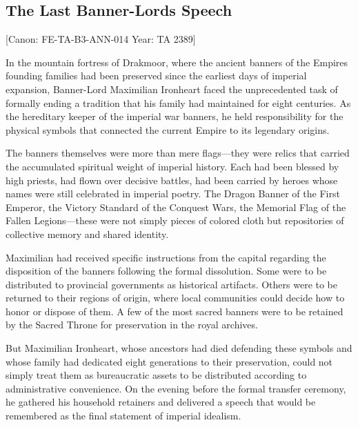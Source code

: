 \subsection{The Last Banner-Lord\textquotesingle s
Speech}\label{the-last-banner-lords-speech}

{[}Canon: FE-TA-B3-ANN-014 \textbar{} Year: TA 2389{]}

In the mountain fortress of Drakmoor, where the ancient banners of the
Empire\textquotesingle s founding families had been preserved since the
earliest days of imperial expansion, Banner-Lord Maximilian Ironheart
faced the unprecedented task of formally ending a tradition that his
family had maintained for eight centuries. As the hereditary keeper of
the imperial war banners, he held responsibility for the physical
symbols that connected the current Empire to its legendary origins.

The banners themselves were more than mere flags---they were relics that
carried the accumulated spiritual weight of imperial history. Each had
been blessed by high priests, had flown over decisive battles, had been
carried by heroes whose names were still celebrated in imperial poetry.
The Dragon Banner of the First Emperor, the Victory Standard of the
Conquest Wars, the Memorial Flag of the Fallen Legions---these were not
simply pieces of colored cloth but repositories of collective memory and
shared identity.

Maximilian had received specific instructions from the capital regarding
the disposition of the banners following the formal dissolution. Some
were to be distributed to provincial governments as historical
artifacts. Others were to be returned to their regions of origin, where
local communities could decide how to honor or dispose of them. A few of
the most sacred banners were to be retained by the Sacred Throne for
preservation in the royal archives.

But Maximilian Ironheart, whose ancestors had died defending these
symbols and whose family had dedicated eight generations to their
preservation, could not simply treat them as bureaucratic assets to be
distributed according to administrative convenience. On the evening
before the formal transfer ceremony, he gathered his household retainers
and delivered a speech that would be remembered as the final statement
of imperial idealism.

